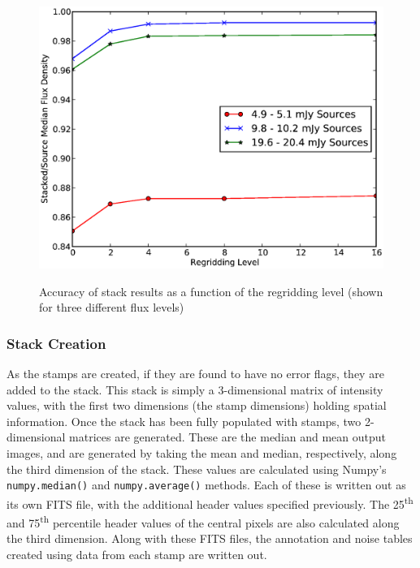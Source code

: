 \documentclass{article}
\begin{document}
\begin{figure}[H]
\centering
\includegraphics[trim=0cm 0cm 0cm 0cm, clip, scale=0.7]{regridding.eps}\\
\caption[Regridding Performance Increase]{Accuracy of stack results as a 
function of the regridding level (shown for three different flux levels)}
\end{figure}


\subsubsection{Stack Creation}
As the stamps are created, if they are found to have no error flags, they are
added to the stack.  This stack is simply a 3-dimensional matrix of 
intensity values, with the first two dimensions (the stamp dimensions) holding 
spatial information.  Once the stack has been fully populated with stamps, two 
2-dimensional matrices are generated.  These are the median and mean 
output images, and are generated by taking the mean and median, respectively, 
along the third dimension of the stack.  These values are calculated using 
Numpy's \verb!numpy.median()! and \verb!numpy.average()! methods. Each of these
is written out as its own FITS file, with the additional header values specified
previously.  The 25\textsuperscript{th} and 75\textsuperscript{th} percentile 
header values of the central pixels are also calculated along the third 
dimension.  Along with these FITS files, the annotation and noise tables 
created using data from each stamp are written out.
\end{document}
